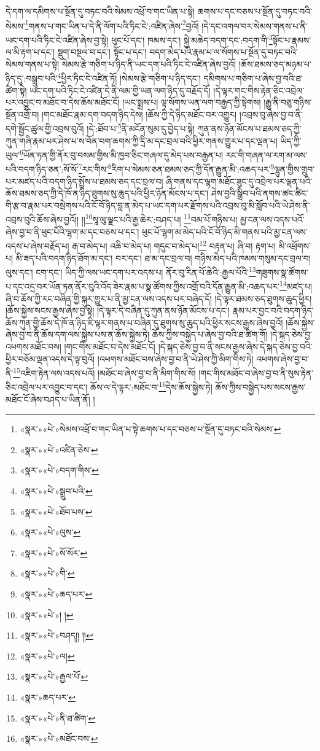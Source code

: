 དེ་དག་ལ་དམིགས་པ་སྔོན་དུ་བཏང་བའི་སེམས་འཕྲོ་བ་གང་ཡིན་པ་སྟེ། ཆགས་པ་དང་བཅས་པ་སྔོན་དུ་བཏང་བའི་སེམས་\footnote{«སྣར་»«པེ་»སེམས་འཕྲོ་བ་གང་ཡིན་པ་སྟེ་ཆགས་པ་དང་བཅས་པ་སྔོན་དུ་བཏང་བའི་སེམས་}གནས་པ་གང་ཡིན་པ་དེ་ནི་ལོག་པའི་ཏིང་ངེ་:འཛིན་ཞེས་\footnote{«སྣར་»«པེ་»འཛིན་ཅེས་}བྱའོ། །དེ་དང་འགལ་བར་སེམས་གནས་པ་ནི་ཡང་དག་པའི་ཏིང་ངེ་འཛིན་ཞེས་བྱ་སྟེ། ཕུང་པོ་དང་། ཁམས་དང་། སྐྱེ་མཆེད་བདག་དང་:བདག་གི་\footnote{«སྣར་»«པེ་»བདག་གིས་}སྟོང་པ་རྣམས་ལ་མི་རྟག་པ་དང་། སྡུག་བསྔལ་བ་དང་། སྟོང་པ་དང་། བདག་མེད་པའི་རྣམ་པ་ལ་སོགས་པ་སྔོན་དུ་བཏང་བའི་སེམས་གནས་པ་སྟེ། སེམས་རྩེ་གཅིག་པ་ཉིད་ནི་ཡང་དག་པའི་ཏིང་ངེ་འཛིན་ཞེས་བྱའོ། །ཆོས་ཐམས་ཅད་མཉམ་པ་ཉིད་དུ་:བསྒྲུབ་པའི་\footnote{«སྣར་»«པེ་»སྒྲུབ་པའི་}ཕྱིར་ཏིང་ངེ་འཛིན་ཏོ། །སེམས་རྩེ་གཅིག་པ་ཉིད་དང་། དམིགས་པ་གཅིག་པ་ཞེས་བྱ་བའི་ཐ་ཚིག་སྟེ། ཡང་དག་པའི་ཏིང་ངེ་འཛིན་དེ་ནི་ལམ་གྱི་ཡན་ལག་ཉིད་དུ་བརྗོད་དོ། །དེ་ལྟར་གང་གིས་རྟེན་ཅིང་འབྲེལ་པར་འབྱུང་བ་མཐོང་བ་དེས་ཆོས་མཐོང་ངོ། །ཡང་སྨྲས་པ། ལྟ་སོགས་ཡན་ལག་བརྒྱད་ཀྱི་སྟེགས། །རྒྱུ་ནི་བཅུ་གཉིས་སྔོན་འགྲོ་བ། །གང་མཐོང་རྣམ་དག་བདག་ཉིད་དེས། །ཆོས་ཀྱི་དེ་ཉིད་མཐོང་བར་འགྱུར། །འབྲས་བུ་ཞེས་བྱ་བ་ནི་དགེ་སྦྱོང་ཚུལ་གྱི་འབྲས་བུའོ། །དེ་:ཐོབ་པ་\footnote{«སྣར་»«པེ་»ཐོབ་པས་}ནི་མངོན་སུམ་དུ་བྱེད་པ་སྟེ། ཀུན་ནས་ཉོན་མོངས་པ་ཐམས་ཅད་ཀྱི་ཀུན་གཞི་རྣམ་པར་ཤེས་པ་ས་བོན་བག་ཆགས་ཀྱི་དྲི་མ་དང་བྲལ་བའི་ཕྱིར་གནས་གྱུར་པ་དང་ལྡན་པ། ཡིད་ཀྱི་ཡུལ་\footnote{«སྣར་»«པེ་»ལུས་}ཡོན་ཏན་གྱི་ནོར་བུ་བསམ་གྱིས་མི་ཁྱབ་ཅིང་གཞལ་དུ་མེད་པས་བརྒྱན་པ། རང་གི་གཞན་ལ་རག་མ་ལས་པའི་བདག་ཉིད་ཅན་:སོ་སོ་\footnote{«སྣར་»«པེ་»སོ་སོར་}རང་གིས་\footnote{«སྣར་»«པེ་»གི་}རིག་པ་སེམས་ཅན་ཐམས་ཅད་ཀྱི་དོན་རྒྱུན་མི་:འཆད་པར་\footnote{«སྣར་»«པེ་»ཆད་པར་}ལྷུན་གྱིས་གྲུབ་པར་མཛད་པའི་བདག་ཉིད་སྤྲོས་པ་ཐམས་ཅད་དང་བྲལ་བ། ཞི་གནས་དང་ལྷག་མཐོང་ཟུང་དུ་འབྲེལ་པར་ལྡན་པའི་ཆོས་ཐམས་ཅད་ཀྱི་དེ་ཁོ་ན་ཉིད་ཐུགས་སུ་ཆུད་པའི་ཕྱིར་ཉོན་མོངས་པ་དང་། ཤེས་བྱའི་སྒྲིབ་པའི་ནགས་ཚང་ཚིང་གི་རྩ་བ་རྣམ་པར་བསྲེགས་པའི་ངོ་བོ་ཉིད་བླ་ན་མེད་པ་ཡང་དག་པར་རྫོགས་པའི་འབྲས་བུ་མི་སློབ་པའི་ཡེ་ཤེས་ནི་འབྲས་བུའི་ཆོས་ཞེས་བྱའོ།། །།\footnote{«སྣར་»«པེ་»། །}སཱ་ལུ་ལྗང་པའི་རྒྱ་ཆེར་:བཤད་པ། \footnote{«སྣར་»«པེ་»བཤད།། །། }བམ་པོ་གཉིས་པ། མྱ་ངན་ལས་འདས་པའོ་ཞེས་བྱ་བ་ནི་ཕུང་པོའི་ལྷག་མ་དང་བཅས་པ་དང་། ཕུང་པོ་ལྷག་མ་མེད་པའི་ངོ་བོ་ཉིད་མི་གནས་པའི་མྱ་ངན་ལས་འདས་པ་ཞེས་བརྗོད་པ། རྒ་བ་མེད་པ། འཆི་བ་མེད་པ། གདུང་བ་མེད་པ།\footnote{«སྣར་»«པེ་»ལ།} བརྟན་པ། ཞི་བ། རྟག་པ། མི་འཕྲོགས་པ། མི་ཟད་པའི་བདག་ཉིད་ཐོག་མ་དང་། བར་དང་། ཐ་མ་དང་བྲལ་བ། གཉིས་མེད་པའི་ཁམས་གསུམ་དང་བྲལ་བ། ལུས་དང་། ངག་དང་། ཡིད་ཀྱི་ལས་ཡང་དག་པར་འདས་པ། ནོར་བུ་རིན་པོ་ཆེའི་:རྒྱལ་པོའི་\footnote{«སྣར་»«པེ་»རྒྱལ་པོ་}གཟུགས་སྣ་ཚོགས་པ་དང་འདྲ་བར་ཡོན་ཏན་ནོར་བུའི་འོད་ཟེར་རྣམ་པ་སྣ་ཚོགས་ཀྱིས་འགྲོ་བའི་དོན་རྒྱུན་མི་:འཆད་པར་\footnote{«སྣར་»ཆད་པར་}མཛད་པ། ཞི་བ་ཆོས་ཀྱི་རང་བཞིན་གྱི་སྐུར་གྱུར་པ་ནི་མྱ་ངན་ལས་འདས་པར་བཞེད་དོ། །དེ་ལྟར་ཐམས་ཅད་ཐུགས་ཆུད་ཕྱིར། །ཆོས་སྐྱེས་སངས་རྒྱས་ཞེས་བྱ་སྟེ། །དེ་ལྟར་དེ་བཞིན་དུ་ཀུན་ནས་ཉོན་མོངས་པ་དང་། རྣམ་པར་བྱང་བའི་བདག་ཉིད་ཆོས་ཀུན་གྱི་ཆོས་དེ་ཁོ་ན་ཉིད་ཇི་ལྟར་གནས་པ་བཞིན་དུ་ཐུགས་སུ་ཆུད་པའི་ཕྱིར་སངས་རྒྱས་ཞེས་བྱའོ། །ཆོས་སྐྱེས་ཞེས་བྱ་བ་ནི་ཆོས་དག་ལས་སྐྱེས་པས་ན་ཆོས་སྐྱེས་ཏེ། ཆོས་ཀྱིས་བསྐྱེད་པ་ཞེས་བྱ་བའི་ཐ་ཚིག་གོ། །དེ་སྐད་ཅེས་བྱ་འཕགས་མཐོང་བས། །གང་གིས་མཐོང་བ་དེས་མཐོང་ངོ། །དེ་སྐད་ཅེས་བྱ་བ་ནི་སངས་རྒྱས་ཞེས་དེ་སྐད་ཅེས་བྱ་བའི་ཕྱིར་བཅོམ་ལྡན་འདས་དེ་ལྟ་བུའོ། །འཕགས་མཐོང་བས་ཞེས་བྱ་བ་ནི་ཡེ་ཤེས་ཀྱི་མིག་གིས་ཏེ། འཕགས་ཞེས་བྱ་བ་ནི་\footnote{«སྣར་»«པེ་»ནི་ཐ་ཚིག་}འཇིག་རྟེན་ལས་འདས་པའོ། །མཐོང་བ་ཞེས་བྱ་བ་ནི་མིག་གིས་སོ། །གང་གིས་མཐོང་བ་ཞེས་བྱ་བ་ནི་སུས་རྟེན་ཅིང་འབྲེལ་པར་འབྱུང་བ་དང་། ཆོས་ལ་དེ་ལྟར་:མཐོང་བ་\footnote{«སྣར་»«པེ་»མཐོང་བས་}དེས་ཆོས་སྐྱེས་ཏེ། ཆོས་ཀྱིས་བསྐྱེད་པས་སངས་རྒྱས་མཐོང་ངོ་ཞེས་བཤད་པ་ཡིན་ནོ། །

